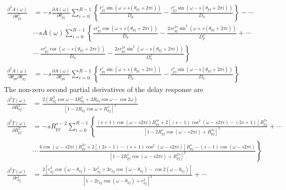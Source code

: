 \documentclass[a4paper,twoside,10pt,english]{report}
\begin{document}
\begin{raggedbottom}
\begin{align*}
\frac{\partial^{2}A\left(\omega\right)}{\partial\theta_{pj}^{2}} &= -s\frac{\partial A\left(\omega\right)}{\partial\theta_{pj}}\sum_{i=0}^{R-1}\left\{ \frac{r_{pj}^{s}\sin\left(\omega+s\left(\theta_{pj}+2\pi i\right)\right)}{D_{p}}-\frac{r_{pj}^{s}\sin\left(\omega-s\left(\theta_{pj}+2\pi i\right)\right)}{D_{n}}\right\} -\cdots\\
 & \cdots sA\left(\omega\right)\sum_{i=0}^{R-1}\left\{ \frac{sr_{pj}^{s}\cos\left(\omega+s\left(\theta_{pj}+2\pi i\right)\right)}{D_{p}}-\frac{2sr_{pj}^{2s}\sin^{2}\left(\omega+s\left(\theta_{pj}+2\pi i\right)\right)}{D_{p}^{2}}+\cdots\right.\\
 & \left.\cdots\,\frac{sr_{pj}^{s}\cos\left(\omega-s\left(\theta_{pj}+2\pi i\right)\right)}{D_{n}}-\frac{2sr_{pj}^{2s}\sin^{2}\left(\omega-s\left(\theta_{pj}+2\pi i\right)\right)}{D_{n}^{2}}\right\} \\
\frac{\partial^{2}A\left(\omega\right)}{\partial\theta_{pk}\partial\theta_{pj}} &= -s\frac{\partial A\left(\omega\right)}{\partial\theta_{pk}}\sum_{i=0}^{R-1}\left\{ \frac{r_{pj}^{s}\sin\left(\omega+s\left(\theta_{pj}+2\pi i\right)\right)}{D_{p}}-\frac{r_{pj}^{s}\sin\left(\omega-s\left(\theta_{pj}+2\pi i\right)\right)}{D_{n}}\right\} 
\end{align*}
The non-zero second partial derivatives of the delay response are
\begin{align*}
\frac{\partial^{2}T\left(\omega\right)}{\partial R_{0j}^{2}} &= \frac{2\left(R_{0j}^{3}\cos\omega-3R_{0j}^{2}+3R_{0j}\cos\omega-\cos2\omega\right)}{\left[1-2R_{0j}\cos\omega+R_{0j}^{2}\right]^{3}}\\
\frac{\partial^{2}T\left(\omega\right)}{\partial R_{pj}^{2}} &= -sR_{pj}^{s-2}\sum_{i=0}^{R-1}\left\{ \frac{\left(s+1\right)\cos\left(\omega-s2\pi i\right)R_{pj}^{4s}+2\left[\left(s-1\right)\cos^{2}\left(\omega-s2\pi i\right)-\left(2s+1\right)\right]R_{pj}^{3s}}{\left[1-2R_{pj}^{s}\cos\left(\omega-s2\pi i\right)+R_{pj}^{2s}\right]^{3}}\right.+\cdots\\
 & \cdots\,\left.\frac{6\cos\left(\omega-s2\pi i\right)R_{pj}^{2s}+2\left[\left(2s-1\right)-\left(s+1\right)\cos^{2}\left(\omega-s2\pi i\right)\right]R_{pj}^{s}-\left(s-1\right)\cos\left(\omega-s2\pi i\right)}{\left[1-2R_{pj}^{s}\cos\left(\omega-s2\pi i\right)+R_{pj}^{2s}\right]^{3}}\right\} \\
\frac{\partial^{2}T\left(\omega\right)}{\partial r_{0j}^{2}} &= \frac{2\left[r_{0j}^{3}\cos\left(\omega-\theta_{0j}\right)-3r_{0j}^{2}+3r_{0j}\cos\left(\omega-\theta_{0j}\right)-\cos2\left(\omega-\theta_{0j}\right)\right]}{\left[1-2r_{0j}\cos\left(\omega-\theta_{0j}\right)+r_{0j}^{2}\right]^{3}}+\cdots\\

\end{align*}
\end{raggedbottom}
\end{document}
